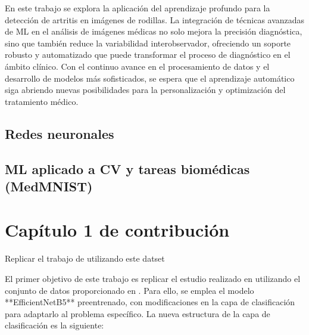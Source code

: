 \documentclass[11pt,spanish,listoffigures,listoftables]{tfgetsinf}
\begin{document}
En este trabajo se explora la aplicación del aprendizaje profundo para la detección de artritis en imágenes de rodillas. La integración de técnicas avanzadas de ML en el análisis de imágenes médicas no solo mejora la precisión diagnóstica, sino que también reduce la variabilidad interobservador, ofreciendo un soporte robusto y automatizado que puede transformar el proceso de diagnóstico en el ámbito clínico. Con el continuo avance en el procesamiento de datos y el desarrollo de modelos más sofisticados, se espera que el aprendizaje automático siga abriendo nuevas posibilidades para la personalización y optimización del tratamiento médico.








\section{Redes neuronales}           %

\section{ML aplicado a CV y tareas biomédicas (MedMNIST)} %


\chapter{Capítulo 1 de contribución}  %

Replicar el trabajo de \cite{10863523} utilizando este datset \cite{chen2018knee}

El primer objetivo de este trabajo es replicar el estudio realizado en \cite{10863523} utilizando el conjunto de datos proporcionado en \cite{chen2018knee}. Para ello, se emplea el modelo **EfficientNetB5** preentrenado, con modificaciones en la capa de clasificación para adaptarlo al problema específico. La nueva estructura de la capa de clasificación es la siguiente:
\end{document}
